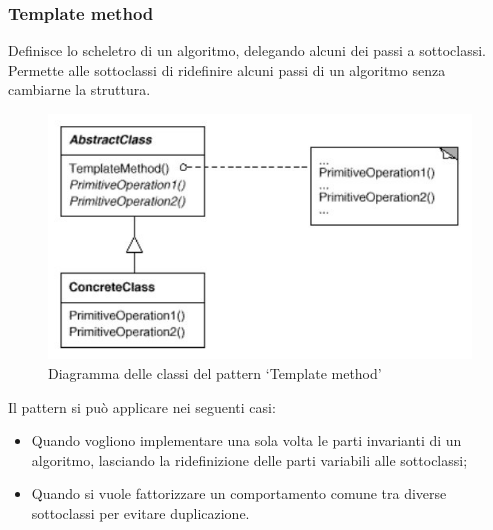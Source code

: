 \subsubsection{Template method} %
\label{ssub:template_method}

Definisce lo scheletro di un algoritmo, delegando alcuni dei passi a
sottoclassi. Permette alle sottoclassi di ridefinire alcuni passi di un
algoritmo senza cambiarne la struttura.

\begin{figure}[h!]
  \centering
  \includegraphics[scale=0.5]{imgs/template-method}
  \caption{Diagramma delle classi del pattern `Template method'}
\end{figure}

Il pattern si può applicare nei seguenti casi:

\begin{itemize}
  \item Quando vogliono implementare una sola volta le parti invarianti di un
  algoritmo, lasciando la ridefinizione delle parti variabili alle sottoclassi;
  \item Quando si vuole fattorizzare un comportamento comune tra diverse
  sottoclassi per evitare duplicazione.
\end{itemize}
